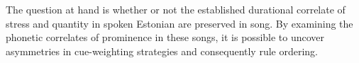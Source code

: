 %
%
The question at hand is whether or not the established durational correlate of stress and quantity in spoken Estonian are preserved in song. By examining the phonetic correlates of prominence in these songs, it is possible to uncover asymmetries in cue-weighting strategies and consequently rule ordering. 
%
